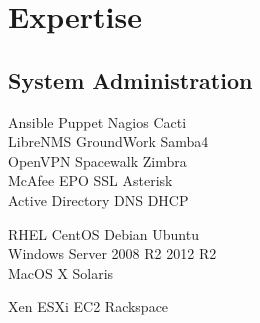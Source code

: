 \documentclass[letterpaper]{deedy-resume} %
\begin{document}
\begin{minipage}[t]{0.33\textwidth}



\section{Expertise}

\subsection{System Administration}
Ansible \textbullet{} Puppet \textbullet{} Nagios \textbullet{} Cacti \\
LibreNMS \textbullet{} GroundWork \textbullet{} Samba4 \\
OpenVPN \textbullet{} Spacewalk \textbullet{} Zimbra \\
McAfee EPO \textbullet{} SSL \textbullet{} Asterisk \\
Active Directory \textbullet{} DNS \textbullet{} DHCP \\

\sectionspace %

RHEL \textbullet{} CentOS \textbullet{} Debian \textbullet{} Ubuntu \\
Windows Server 2008 R2 \textbullet{} 2012 R2 \\
MacOS X \textbullet{} Solaris %

\sectionspace %

Xen \textbullet{} ESXi \textbullet{} EC2 \textbullet{} Rackspace \\

\sectionspace %


\end{minipage}
\end{document}
